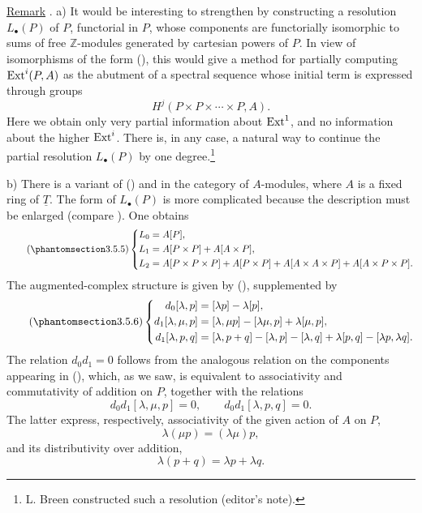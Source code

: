 \underline{Remark} . a) It would be interesting to strengthen
 by constructing a resolution $L_\bullet(P)$ of $P$, functorial
in $P$, whose components are functorially isomorphic to sums of free
$\mathbb Z$-modules generated by cartesian powers of $P$.  In view
of isomorphisms of the form (), this would give a method for
partially computing $\operatorname{Ext}^i(P,A)$ as the abutment of a spectral
sequence whose initial term is expressed through groups
\[
 H^j(P\times P\times\cdots\times P,A).
\]
Here we obtain only very partial information about $\operatorname{Ext}^1$, and no
information about the higher $\operatorname{Ext}^i$.  There is, in any case, a
natural way to continue the partial resolution $L_\bullet(P)$ by one
degree.\footnote{L. Breen constructed such a resolution (editor's
note).}

b) There is a variant of () and  in the category of
$A$-modules, where $A$ is a fixed ring of $\underline T$.  The form
of $L_\bullet(P)$ is more complicated because the description 
must be enlarged (compare ).  One obtains
\begin{equation}\tag{\SGARefTarget{sga7.sga7i.evii.n3-5-5}{3.5.5}}
\left\{
\begin{aligned}
 L_0={}&A[P],\\
 L_1={}&A[P\times P]+A[A\times P],\\
 L_2={}&A[P\times P\times P]+A[P\times P]
       +A[A\times A\times P]+A[A\times P\times P].
\end{aligned}
\right.
\end{equation}
The augmented-complex structure is given by (), supplemented by
\begin{equation}\tag{\SGARefTarget{sga7.sga7i.evii.n3-5-6}{3.5.6}}
\left\{
\begin{aligned}
 d_0[\lambda,p]={}&[\lambda p]-\lambda[p],\\
 d_1[\lambda,\mu,p]={}&[\lambda,\mu p]-[\lambda\mu,p]
                         +\lambda[\mu,p],\\
 d_1[\lambda,p,q]={}&[\lambda,p+q]-[\lambda,p]-[\lambda,q]
                       +\lambda[p,q]-[\lambda p,\lambda q].
\end{aligned}
\right.
\end{equation}
The relation $d_0d_1=0$ follows from the analogous relation on the
components appearing in (), which, as we saw, is equivalent to
associativity and commutativity of addition on $P$, together with
the relations
\[
 d_0d_1[\lambda,\mu,p]=0,
 \qquad d_0d_1[\lambda,p,q]=0.
\]
The latter express, respectively, associativity of the given action
of $A$ on $P$,
\[
 \lambda(\mu p)=(\lambda\mu)p,
\]
and its distributivity over addition,
\[
 \lambda(p+q)=\lambda p+\lambda q.
\]

